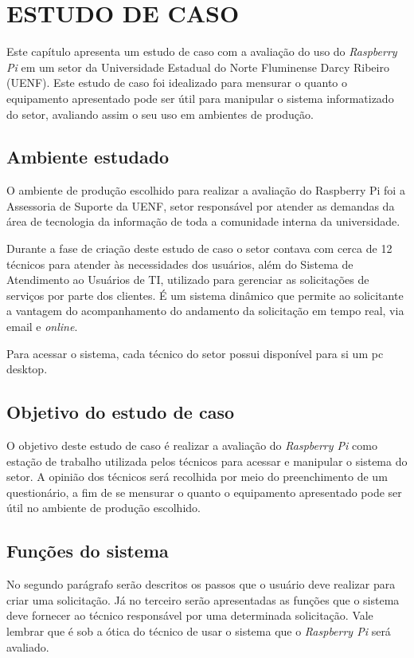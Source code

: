 \chapter{ESTUDO DE CASO}

Este capítulo apresenta um estudo de caso com a avaliação do uso do \textit{Raspberry Pi} em um setor da Universidade Estadual do Norte Fluminense Darcy Ribeiro (UENF). Este estudo de caso foi idealizado para mensurar o quanto o equipamento apresentado pode ser útil para manipular o sistema informatizado do setor, avaliando assim o seu uso em ambientes de produção.

\section{Ambiente estudado}

O ambiente de produção escolhido para realizar a avaliação do Raspberry Pi foi a Assessoria de Suporte da UENF, setor responsável por atender as demandas da área de tecnologia da informação de toda a comunidade interna da universidade.

Durante a fase de criação deste estudo de caso o setor contava com cerca de 12 técnicos para atender às necessidades dos usuários, além do Sistema de Atendimento ao Usuários de TI, utilizado para gerenciar as solicitações de serviços por parte dos clientes. É um sistema dinâmico que permite ao solicitante a vantagem do acompanhamento do andamento da solicitação em tempo real, via email e \textit{online}.

Para acessar o sistema, cada técnico do setor possui disponível para si um pc desktop.

\section{Objetivo do estudo de caso}

O objetivo deste estudo de caso é realizar a avaliação do \textit{Raspberry Pi} como estação de trabalho utilizada pelos técnicos para acessar e manipular o sistema do setor. A opinião dos técnicos será recolhida por meio do preenchimento de um questionário, a fim de se mensurar o quanto o equipamento apresentado pode ser útil no ambiente de produção escolhido.

\section{Funções do sistema}

No segundo parágrafo serão descritos os passos que o usuário deve realizar para criar uma solicitação. Já no terceiro serão apresentadas as funções que o sistema deve fornecer ao técnico responsável por uma determinada solicitação. Vale lembrar que é sob a ótica do técnico de usar o sistema que o \textit{Raspberry Pi} será avaliado.


